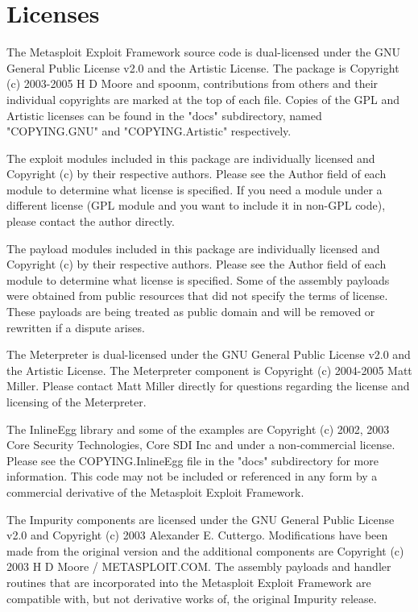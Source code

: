 \documentclass{report}
\begin{document}
\pagebreak
\chapter{Licenses}

\par
The Metasploit Exploit Framework source code is dual-licensed under the GNU
General Public License v2.0 and the Artistic License. The package is Copyright
(c) 2003-2005 H D Moore and spoonm, contributions from others and their
individual copyrights are marked at the top of each file. Copies of the GPL and
Artistic licenses can be found in the "docs" subdirectory, named "COPYING.GNU"
and "COPYING.Artistic" respectively.

\par
The exploit modules included in this package are individually licensed and
Copyright (c) by their respective authors. Please see the Author field of each
module to determine what license is specified. If you need a module under a
different license (GPL module and you want to include it in non-GPL code),
please contact the author directly.

\par
The payload modules included in this package are individually licensed and
Copyright (c) by their respective authors. Please see the Author field of each
module to determine what license is specified. Some of the assembly payloads
were obtained from public resources that did not specify the terms of license.
These payloads are being treated as public domain and will be removed or
rewritten if a dispute arises.

\par
The Meterpreter is dual-licensed under the GNU General Public License v2.0 and
the Artistic License. The Meterpreter component is Copyright (c) 2004-2005 Matt
Miller. Please contact Matt Miller directly for questions regarding the license
and licensing of the Meterpreter. 

\par
The InlineEgg library and some of the examples are Copyright (c) 2002, 2003 Core
Security Technologies, Core SDI Inc and under a non-commercial license. Please
see the COPYING.InlineEgg file in the "docs" subdirectory for more information.
This code may not be included or referenced in any form by a commercial
derivative of the Metasploit Exploit Framework.

\par
The Impurity components are licensed under the GNU General Public License v2.0
and Copyright (c) 2003 Alexander E. Cuttergo. Modifications have been made from
the original version and the additional components are Copyright (c) 2003 H D
Moore / METASPLOIT.COM. The assembly payloads and handler routines that are
incorporated into the Metasploit Exploit Framework are compatible with, but not
derivative works of, the original Impurity release.
\end{document}
